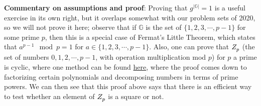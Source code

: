 \begin{solution}
\textbf{Commentary on assumptions and proof}: Proving that
\(g^{|\mathbb{G}|}=1\) is a useful exercise in its own right, but it
overlaps somewhat with our problem sets of 2020, so we will not prove it
here; observe that if \(\mathbb{G}\) is the set of
\(\{1,2,3,\cdots,p-1\}\) for some prime \(p\), then this is a special
case of Fermat's Little Theorem, which states that
\(a^{p-1} \mod p = 1\) for \(a \in \{1,2,3,\cdots,p-1\}\). Also, one can
prove that \(Z_p^{\*}\) (the set of numbers \(0,1,2,\cdots,p-1\), with
operation multiplication mod \(p\)) for \(p\) a prime is cyclic, where
one method can be found
\href{https://crypto.stanford.edu/pbc/notes/numbertheory/gen.html}{here},
where the proof comes down to factorizing certain polynomials and
decomposing numbers in terms of prime powers. We can then see that this
proof above says that there is an efficient way to test whether an
element of \(Z_p^{\*}\) is a square or not.

\end{solution}
